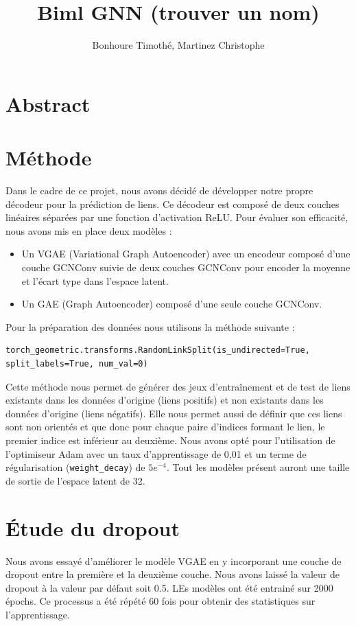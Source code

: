 \documentclass{article}
\begin{document}
\title{Biml GNN (trouver un nom)}
\author{Bonhoure Timothé, Martinez Christophe}                      %

\maketitle
\tableofcontents
\section*{Abstract}
\newpage

\section{Méthode}

Dans le cadre de ce projet, nous avons décidé de développer notre propre décodeur pour la prédiction de liens. Ce décodeur est composé de deux couches linéaires séparées par une fonction d'activation ReLU. Pour évaluer son efficacité, nous avons mis en place deux modèles :
\begin{itemize}
    \item Un VGAE (Variational Graph Autoencoder) avec un encodeur composé d'une couche GCNConv suivie de deux couches GCNConv pour encoder la moyenne et l'écart type dans l'espace latent.
    \item Un GAE (Graph Autoencoder) composé d'une seule couche GCNConv.
\end{itemize}
Pour la préparation des données nous utilisons la méthode suivante :
\begin{verbatim}
torch_geometric.transforms.RandomLinkSplit(is_undirected=True, split_labels=True, num_val=0)
\end{verbatim}
Cette méthode nous permet de générer des jeux d’entraînement et de test de liens existants dans les données d'origine (liens positifs) et non existants dans les données d'origine (liens négatifs). Elle nous permet aussi de définir que ces liens sont non orientés et que donc pour chaque paire d’indices formant le lien, le premier indice est inférieur au deuxième.
Nous avons opté pour l'utilisation de l'optimiseur Adam avec un taux d'apprentissage de 0,01 et un terme de régularisation (\texttt{weight\_decay}) de \(5e^{-4}\).
Tout les modèles présent auront une taille de sortie de l'espace latent de 32. 

\section{Étude du dropout}
Nous avons essayé d'améliorer le modèle VGAE en y incorporant une couche de dropout entre la première et la deuxième couche. Nous avons laissé la valeur de dropout à la valeur par défaut soit 0.5. LEs modèles ont été entrainé sur 2000 épochs. Ce processus a été répété 60 fois pour obtenir des statistiques sur l'apprentissage.
\end{document}
